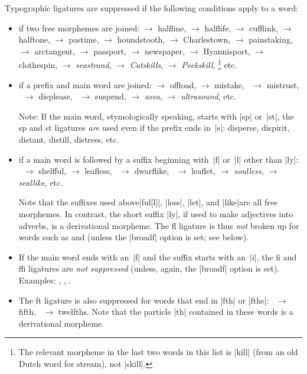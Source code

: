 \documentclass[11pt]{article}
\begin{document}
Typographic ligatures are suppressed if the following conditions apply to a word:
\begin{itemize}
\item if two free morphemes are joined: 
 $\to$ halfline, 
 $\to$ halflife, 
 $\to$ cufflink, 
 $\to$ halftone, 
 $\to$ pastime,
 $\to$ houndstooth, 
 $\to$ Charlestown, 
 $\to$ painstaking,
 $\to$ arctangent, 
 $\to$ passport,
 $\to$ newspaper, 
 $\to$ Hyannisport,  
 $\to$ clothespin, 
\emph{} $\to$ \emph{seastrand}, 
\emph{\ebg {} $\to$ Catskills}, 
\emph{\ebg {} $\to$ Peekskill},%
\footnote{The relevant morpheme in the last two words in this list is |kill| (from an old Dutch word for stream), not |skill|.} etc.

\item if a prefix and main word are joined: 
 $\to$ offload, 
 $\to$ mistake,
~$\to$ mistrust, 
~$\to$ displease, 
~$\to$ suspend, 
\emph{ $\to$ asea}, 
\emph{ $\to$ ultrasound}, 
etc. 

Note: If the main word, etymologically speaking, starts with |sp| or~|st|, the sp and st ligatures \emph{are} used even if the prefix ends in~|s|: disperse, dispirit, distant, distill, distress, etc. 

\item if a main word is followed by a suffix beginning with~|f| or~|l| other than |ly|: ~$\to$ shelfful, 
 $\to$ leafless, 
~$\to$ dwarflike, 
~$\to$ leaflet, 
\emph{ $\to$ soulless}, 
\emph{ $\to$ seallike}, 
etc. 

\enlargethispage{1.5\baselineskip}

Note that the suffixes used above\textemdash |ful[l]|, |less|, |let|, and |like|\textemdash are all free morphemes. In contrast, the short suffix |ly|, if used to make adjectives into adverbs, is a derivational morpheme. The fl ligature is thus \emph{not} broken up for words such as  and  (unless the |broadf| option is set; see below).

\item If the main word ends with an~|f| and the suffix starts with an~|i|, the fi and ffi ligatures are \emph{not suppressed} (unless, again, the |broadf| option is set). Examples: 
, 
, 
.

\item The ft ligature is also suppressed for words that end in |fth| or |fths|: ~$\to$ fifth, ~$\to$ twelfths. Note that the particle |th| contained in these words is a derivational morpheme.

\end{itemize}
\end{document}
